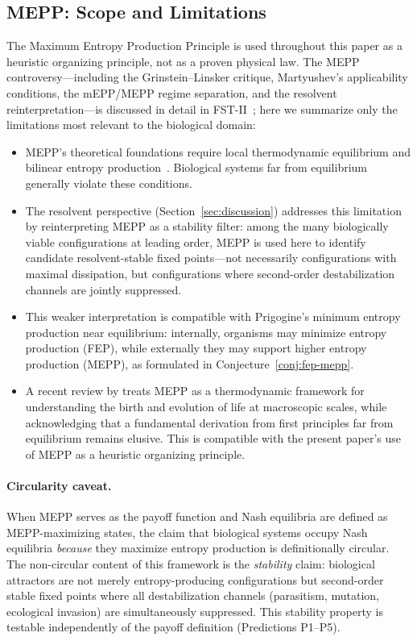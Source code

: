 \documentclass[12pt,a4paper]{article}
\theoremstyle{remark}
\begin{document}
\subsection{MEPP: Scope and Limitations}

The Maximum Entropy Production Principle is used throughout this paper as a heuristic organizing principle, not as a proven physical law. The MEPP controversy---including the Grinstein--Linsker critique, Martyushev's applicability conditions, the mEPP/MEPP regime separation, and the resolvent reinterpretation---is discussed in detail in FST-II~\citep{FSTII}; here we summarize only the limitations most relevant to the biological domain:
\begin{itemize}
\item MEPP's theoretical foundations require local thermodynamic equilibrium and bilinear entropy production~\citep{Martyushev2010}. Biological systems far from equilibrium generally violate these conditions.
\item The resolvent perspective (Section~\ref{sec:discussion}) addresses this limitation by reinterpreting MEPP as a stability filter: among the many biologically viable configurations at leading order, MEPP is used here to identify candidate resolvent-stable fixed points---not necessarily configurations with maximal dissipation, but configurations where second-order destabilization channels are jointly suppressed.
\item This weaker interpretation is compatible with Prigogine's minimum entropy production near equilibrium: internally, organisms may minimize entropy production (FEP), while externally they may support higher entropy production (MEPP), as formulated in Conjecture~\ref{conj:fep-mepp}.
\item A recent review by \citet{Toma2025} treats MEPP as a thermodynamic framework for understanding the birth and evolution of life at macroscopic scales, while acknowledging that a fundamental derivation from first principles far from equilibrium remains elusive. This is compatible with the present paper's use of MEPP as a heuristic organizing principle.
\end{itemize}

\paragraph{Circularity caveat.} When MEPP serves as the payoff function and Nash equilibria are defined as MEPP-maximizing states, the claim that biological systems occupy Nash equilibria \emph{because} they maximize entropy production is definitionally circular. The non-circular content of this framework is the \emph{stability} claim: biological attractors are not merely entropy-producing configurations but second-order stable fixed points where all destabilization channels (parasitism, mutation, ecological invasion) are simultaneously suppressed. This stability property is testable independently of the payoff definition (Predictions P1--P5).
\end{document}
